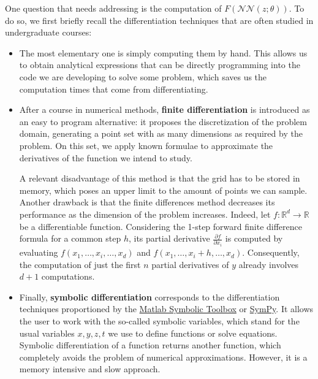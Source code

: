 \documentclass[12pt]{report} %
\newcommand{\tmstrong}[1]{\textbf{#1}}
\begin{document}
One question that needs addressing is the computation of $F
  (\mathcal{N}\mathcal{N} (z ; \theta))$. To do so, we first briefly recall the
differentiation techniques that are often studied in undergraduate courses:
\begin{itemize}
  \item The most elementary one is simply computing them by hand. This allows
        us to obtain analytical expressions that can be directly programming into
        the code we are developing to solve some problem, which saves us the
        computation times that come from differentiating.

  \item After a course in numerical methods, {\tmstrong{finite
              differentiation}} is introduced as an easy to program alternative: it
        proposes the discretization of the problem domain, generating a point set
        with as many dimensions as required by the problem. On this set, we apply
        known formulae to approximate the derivatives of the function we intend to
        study.

        A relevant disadvantage of this method is that the grid has to be stored in memory, which poses an upper
        limit to the amount of points we can sample. Another drawback is that the finite differences method decreases its performance as the
        dimension of the problem increases. Indeed, let $f : \mathbb{R}^d
          \rightarrow \mathbb{R}$ be a differentiable function. Considering the 1-step
        forward finite difference formula for a common step $h$, its partial
        derivative $\frac{\partial f}{\partial x_i}$ is computed by evaluating $f
          (x_1, \ldots, x_i, \ldots, x_d)$ and $f (x_1, \ldots, x_i + h, \ldots,
          x_d)$. Consequently, the computation of just the first $n$ partial
        derivatives of $y$ already involves $d + 1$ computations.

  \item Finally, {\tmstrong{symbolic differentiation}} corresponds to the
        differentiation techniques proportioned by the \href{https://www.mathworks.com/help/symbolic/index.html?s\_tid=CRUX\_lftnav}{Matlab Symbolic Toolbox} or \href{https://www.sympy.org/en/index.html}{SymPy}.
        It allows the user to work with the so-called symbolic variables, which
        stand for the usual variables $x, y, z, t$ we use to define functions or
        solve equations. Symbolic differentiation of a function returns another
        function, which completely avoids the problem of numerical approximations.
        However, it is a memory intensive and slow approach.
\end{itemize}
\end{document}
